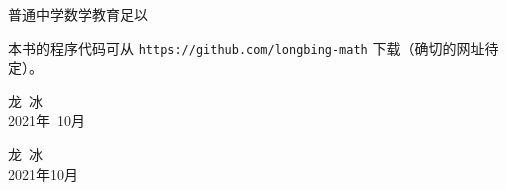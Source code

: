 普通中学数学教育足以


本书的程序代码可从 \verb|https://github.com/longbing-math| 下载（确切的网址待定）。


{\kaishu
	\begin{center}
		\hspace*{88mm}龙\,   冰\\
		\hspace*{88mm}2021年~10月
	\end{center}
}

\begin{flushright}
	\centering
{\kaishu 龙\,  冰}\\
2021年10月
\end{flushright}
%

